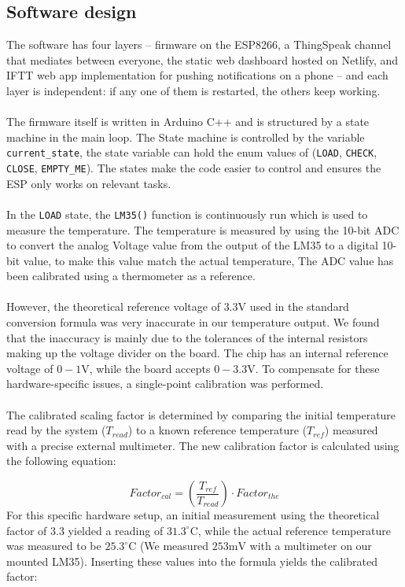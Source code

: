 \documentclass{article}
\begin{document}
\fi

\subsection{Software design}
\label{sec:software}

The software has four layers -- firmware on the ESP8266, a ThingSpeak channel that mediates between everyone, the static web dashboard hosted on Netlify, and IFTT web app implementation for pushing notifications on a phone -- and each layer is independent: if any one of them is restarted, the others keep working.
\\ \\
The firmware itself is written in Arduino C++ and is structured by a state machine in the main loop. The State machine is controlled by the variable \texttt{current\_state}, the state variable can hold the enum values of (\texttt{LOAD}, \texttt{CHECK}, \texttt{CLOSE}, \texttt{EMPTY\_ME}). The states make the code easier to control and ensures the ESP only works on relevant tasks.\\\\
In the \texttt{LOAD} state, the \texttt{LM35()} function is continuously run which is used to measure the temperature. The temperature is measured by using the 10-bit ADC to convert the analog Voltage value from the output of the LM35 to a digital 10-bit value, to make this value match the actual temperature, The ADC value has been calibrated using a thermometer as a reference. \\\\
However, the theoretical reference voltage of $3.3\text{V}$ used in the standard conversion formula was very inaccurate in our temperature output. We found that the inaccuracy is mainly due to the tolerances of the internal resistors making up the voltage divider on the board. The chip has an internal reference voltage of $0-1\text{V}$, while the board accepts $0-3.3\text{V}$. To compensate for these hardware-specific issues, a single-point calibration was performed.\\\\
The calibrated scaling factor is determined by comparing the initial temperature read by the system ($T_{read}$) to a known reference temperature ($T_{ref}$) measured with a precise external multimeter. The new calibration factor is calculated using the following equation:

\begin{equation}
    Factor_{cal} = \left( \frac{T_{ref}}{T_{read}} \right) \cdot Factor_{the}
\end{equation}
For this specific hardware setup, an initial measurement using the theoretical factor of $3.3$ yielded a reading of $31.3^\circ\text{C}$, while the actual reference temperature was measured to be $25.3^\circ\text{C}$ (We measured $253\text{mV}$ with a multimeter on our mounted LM35). Inserting these values into the formula yields the calibrated factor:
\end{document}

